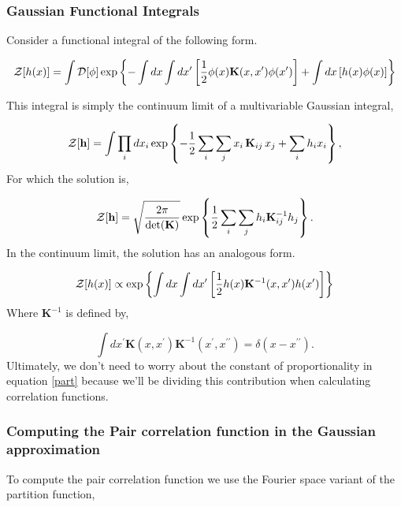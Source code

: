\subsubsection{Gaussian Functional Integrals}

Consider a functional integral of the following form. 

\begin{equation}
\mathcal{Z}[h(x)] = \int \mathcal{D}[\phi] \exp\left\lbrace - \int dx \int dx^\prime \left[ \frac{1}{2}\phi(x) \mathbf{K}(x, x^\prime) \phi(x^\prime)\right] +  \int dx \left[h(x) \phi(x)\right]\right\rbrace
\end{equation}

This integral is simply the continuum limit of a multivariable Gaussian integral, 

\begin{equation}
\mathcal{Z}[\mathbf{h}] = \int \prod_i dx_i \exp \left\lbrace - \frac{1}{2}\sum_i \sum_j x_i\, \mathbf{K}_{ij}\, x_j  + \sum_i h_i x_i\right\rbrace,
\end{equation}
For which the solution is, 

\begin{equation}
\mathcal{Z}[\mathbf{h}] = \sqrt{\frac{2\pi}{\det(\mathbf{K})}} \exp\left\lbrace \frac{1}{2} \sum_i \sum_j h_i \mathbf{K}_{ij}^{-1} h_j\right\rbrace.
\end{equation}
In the continuum limit, the solution has an analogous form. 

\begin{equation}\label{part}
\mathcal{Z}[h(x)] \propto \exp\left\lbrace \int dx \int dx^\prime \left[ \frac{1}{2}h(x) \mathbf{K}^{-1}(x, x^\prime) h(x^\prime)\right] \right\rbrace
\end{equation}
Where $\mathbf{K}^{-1}$ is defined by, 

\begin{equation}
\int dx^\prime \mathbf{K}(x, x^\prime)\mathbf{K}^{-1}(x^\prime, x^{\prime\prime}) = \delta(x - x^{\prime\prime}).
\end{equation}
Ultimately, we don't need to worry about the constant of proportionality in equation \ref{part} because we'll be dividing this contribution when calculating correlation functions. 

\subsubsection{Computing the Pair correlation function in the Gaussian approximation}

To compute the pair correlation function we use the Fourier space variant of the partition function, 

